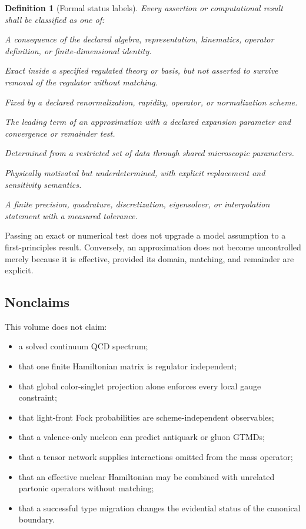 \documentclass[11pt]{article}
\newtheorem{definition}{Definition}[section]
\begin{document}
\begin{definition}[Formal status labels]
Every assertion or computational result shall be classified as one of:
\begin{description}[leftmargin=2.45cm,style=nextline]
\item[Exact] A consequence of the declared algebra, representation,
kinematics, operator definition, or finite-dimensional identity.
\item[Regulator-exact] Exact inside a specified regulated theory or basis,
but not asserted to survive removal of the regulator without matching.
\item[Scheme-defined] Fixed by a declared renormalization, rapidity,
operator, or normalization scheme.
\item[Controlled] The leading term of an approximation with a declared
expansion parameter and convergence or remainder test.
\item[Calibrated] Determined from a restricted set of data through shared
microscopic parameters.
\item[Model] Physically motivated but underdetermined, with explicit
replacement and sensitivity semantics.
\item[Numerical] A finite precision, quadrature, discretization, eigensolver,
or interpolation statement with a measured tolerance.
\end{description}
\end{definition}

Passing an exact or numerical test does not upgrade a model assumption to a
first-principles result.  Conversely, an approximation does not become
uncontrolled merely because it is effective, provided its domain, matching,
and remainder are explicit.

\subsection{Nonclaims}

This volume does not claim:
\begin{itemize}
\item a solved continuum QCD spectrum;
\item that one finite Hamiltonian matrix is regulator independent;
\item that global color-singlet projection alone enforces every local gauge
constraint;
\item that light-front Fock probabilities are scheme-independent
observables;
\item that a valence-only nucleon can predict antiquark or gluon GTMDs;
\item that a tensor network supplies interactions omitted from the mass
operator;
\item that an effective nuclear Hamiltonian may be combined with unrelated
partonic operators without matching;
\item that a successful type migration changes the evidential status of the
canonical boundary.
\end{itemize}
\end{document}
